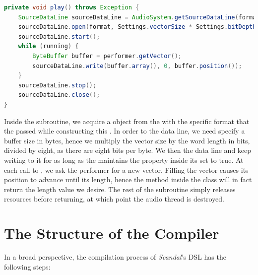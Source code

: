 \begin{lstlisting}[language=Java,caption={Writing buffers of audio data inside the \il{play} subroutine.},label={alg:play}]
private void play() throws Exception {
	SourceDataLine sourceDataLine = AudioSystem.getSourceDataLine(format);
	sourceDataLine.open(format, Settings.vectorSize * Settings.bitDepth / 8);
	sourceDataLine.start();
	while (running) {
		ByteBuffer buffer = performer.getVector();
		sourceDataLine.write(buffer.array(), 0, buffer.position());
	}
	sourceDataLine.stop();
	sourceDataLine.close();
}
\end{lstlisting}

Inside the  subroutine, we acquire a  object from the  with the specific format that the  passed while constructing this . In order to  the data line, we need specify a buffer size in bytes, hence we multiply the vector size by the word length in bits, divided by eight, as there are eight bits per byte. We then  the data line and keep writing to it for as long as the  maintains the  property inside its  set to true. At each call to , we ask the performer for a new vector. Filling the vector causes its position to advance until its length, hence the  method inside the  class will in fact return the length value we desire. The rest of the  subroutine simply releases resources before returning, at which point the audio thread is destroyed.

\section{The Structure of the Compiler}

In a broad perspective, the compilation process of \emph{Scandal}'s DSL has the following steps:

